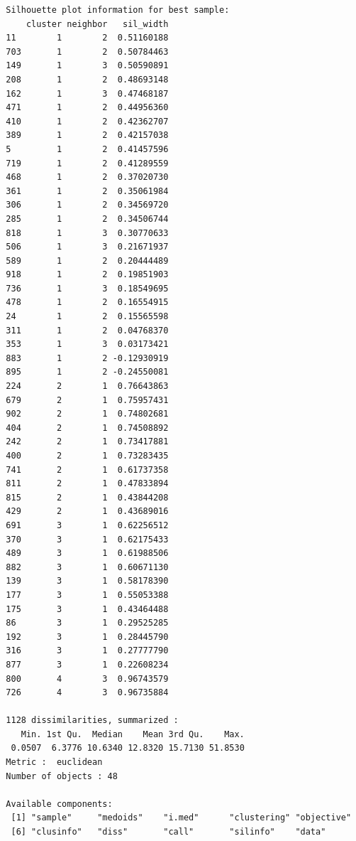 \documentclass[12pt,twoside]{amherstthesis}
\begin{document}
\begin{verbatim}
  Silhouette plot information for best sample:
      cluster neighbor   sil_width
  11        1        2  0.51160188
  703       1        2  0.50784463
  149       1        3  0.50590891
  208       1        2  0.48693148
  162       1        3  0.47468187
  471       1        2  0.44956360
  410       1        2  0.42362707
  389       1        2  0.42157038
  5         1        2  0.41457596
  719       1        2  0.41289559
  468       1        2  0.37020730
  361       1        2  0.35061984
  306       1        2  0.34569720
  285       1        2  0.34506744
  818       1        3  0.30770633
  506       1        3  0.21671937
  589       1        2  0.20444489
  918       1        2  0.19851903
  736       1        3  0.18549695
  478       1        2  0.16554915
  24        1        2  0.15565598
  311       1        2  0.04768370
  353       1        3  0.03173421
  883       1        2 -0.12930919
  895       1        2 -0.24550081
  224       2        1  0.76643863
  679       2        1  0.75957431
  902       2        1  0.74802681
  404       2        1  0.74508892
  242       2        1  0.73417881
  400       2        1  0.73283435
  741       2        1  0.61737358
  811       2        1  0.47833894
  815       2        1  0.43844208
  429       2        1  0.43689016
  691       3        1  0.62256512
  370       3        1  0.62175433
  489       3        1  0.61988506
  882       3        1  0.60671130
  139       3        1  0.58178390
  177       3        1  0.55053388
  175       3        1  0.43464488
  86        3        1  0.29525285
  192       3        1  0.28445790
  316       3        1  0.27777790
  877       3        1  0.22608234
  800       4        3  0.96743579
  726       4        3  0.96735884
  
  1128 dissimilarities, summarized :
     Min. 1st Qu.  Median    Mean 3rd Qu.    Max. 
   0.0507  6.3776 10.6340 12.8320 15.7130 51.8530 
  Metric :  euclidean 
  Number of objects : 48
  
  Available components:
   [1] "sample"     "medoids"    "i.med"      "clustering" "objective" 
   [6] "clusinfo"   "diss"       "call"       "silinfo"    "data"      
  \end{verbatim}
  
  \begin{Shaded}
  \begin{Highlighting}[]
  \OperatorTok{$}
  \OperatorTok{$} \OperatorTok{:}\NormalTok{, } \NormalTok{)}
  \end{Highlighting}
  \end{Shaded}
  
\end{document}
